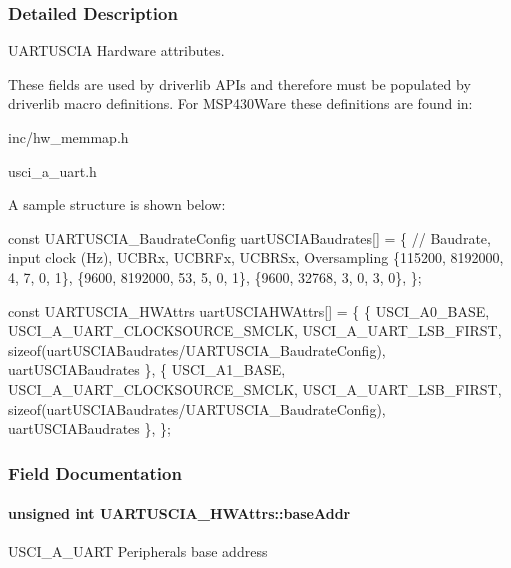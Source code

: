 \subsubsection{Detailed Description}
U\+A\+R\+T\+U\+S\+C\+I\+A Hardware attributes. 

These fields are used by driverlib A\+P\+Is and therefore must be populated by driverlib macro definitions. For M\+S\+P430\+Ware these definitions are found in\+:
\begin{DoxyItemize}
\item inc/hw\+\_\+memmap.\+h
\item usci\+\_\+a\+\_\+uart.\+h
\end{DoxyItemize}

A sample structure is shown below\+: 
\begin{DoxyCode}
\textcolor{keyword}{const} UARTUSCIA_BaudrateConfig uartUSCIABaudrates[] = \{
 \textcolor{comment}{// Baudrate, input clock (Hz), UCBRx, UCBRFx, UCBRSx, Oversampling}
    \{115200,  8192000,          4,     7,      0,      1\},
    \{9600,    8192000,          53,    5,      0,      1\},
    \{9600,    32768,            3,     0,      3,      0\},
\};

\textcolor{keyword}{const} UARTUSCIA_HWAttrs uartUSCIAHWAttrs[] = \{
    \{
        USCI\_A0\_BASE,
        USCI\_A\_UART\_CLOCKSOURCE\_SMCLK,
        USCI\_A\_UART\_LSB\_FIRST,
        \textcolor{keyword}{sizeof}(uartUSCIABaudrates/UARTUSCIA_BaudrateConfig),
        uartUSCIABaudrates
    \},
    \{
        USCI\_A1\_BASE,
        USCI\_A\_UART\_CLOCKSOURCE\_SMCLK,
        USCI\_A\_UART\_LSB\_FIRST,
        \textcolor{keyword}{sizeof}(uartUSCIABaudrates/UARTUSCIA_BaudrateConfig),
        uartUSCIABaudrates
    \},
\};
\end{DoxyCode}
 

\subsubsection{Field Documentation}
\paragraph[{base\+Addr}]{\setlength{\rightskip}{0pt plus 5cm}unsigned int U\+A\+R\+T\+U\+S\+C\+I\+A\+\_\+\+H\+W\+Attrs\+::base\+Addr}\label{struct_u_a_r_t_u_s_c_i_a___h_w_attrs_aceece5625f03db035c4602c1f67e8038}
U\+S\+C\+I\+\_\+\+A\+\_\+\+U\+A\+R\+T Peripheral\textquotesingle{}s base address 
